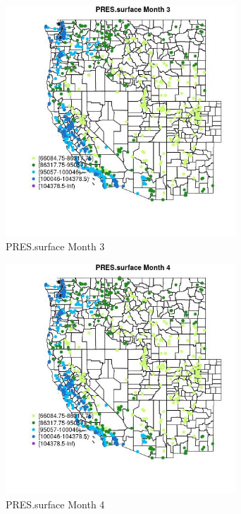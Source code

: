 \begin{figure} 
\centering  
\includegraphics[width=0.77\textwidth]{Code_Outputs/Report_ML_input_PM25_Step4_part_f_de_duplicated_aves_prioritize_24hr_obswNAs_MapObsMo3PRESsurface.jpg} 
\caption{\label{fig:Report_ML_input_PM25_Step4_part_f_de_duplicated_aves_prioritize_24hr_obswNAsMapObsMo3PRESsurface}PRES.surface Month 3} 
\end{figure} 
 

\begin{figure} 
\centering  
\includegraphics[width=0.77\textwidth]{Code_Outputs/Report_ML_input_PM25_Step4_part_f_de_duplicated_aves_prioritize_24hr_obswNAs_MapObsMo4PRESsurface.jpg} 
\caption{\label{fig:Report_ML_input_PM25_Step4_part_f_de_duplicated_aves_prioritize_24hr_obswNAsMapObsMo4PRESsurface}PRES.surface Month 4} 
\end{figure} 
 

